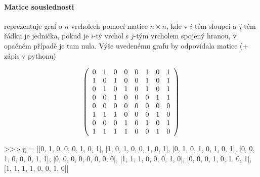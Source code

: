 \paragraph{Matice souslednosti} reprezentuje graf o $n$ vrcholech pomocí matice $n\times n$, kde v $i$-tém sloupci a $j$-tém řádku je jednička, pokud
je $i$-tý vrchol s $j$-tým vrcholem spojený hranou, v opačném případě je tam nula. Výše uvedenému grafu by odpovídala matice (+ zápis v pythonu)
\begin{center}
\begin{minipage}{5cm}
$$
\left(
\begin{array}{cccccccc}
0 & 1 & 0 & 0 & 0 & 1 & 0 & 1\cr
1 & 0 & 1 & 0 & 0 & 1 & 0 & 1\cr
0 & 1 & 0 & 1 & 0 & 1 & 0 & 1\cr
0 & 0 & 1 & 0 & 0 & 0 & 1 & 1\cr
0 & 0 & 0 & 0 & 0 & 0 & 0 & 0\cr
1 & 1 & 1 & 0 & 0 & 0 & 1 & 0\cr
0 & 0 & 0 & 1 & 0 & 1 & 0 & 1\cr
1 & 1 & 1 & 1 & 0 & 0 & 1 & 0\cr
\end{array}
\right)
$$
\end{minipage}
\hskip2cm
\begin{minipage}{8cm}
\begin{python}
>>> g = [[0, 1, 0, 0, 0, 1, 0, 1],
	 [1, 0, 1, 0, 0, 1, 0, 1],
	 [0, 1, 0, 1, 0, 1, 0, 1],
	 [0, 0, 1, 0, 0, 0, 1, 1],
	 [0, 0, 0, 0, 0, 0, 0, 0],
	 [1, 1, 1, 0, 0, 0, 1, 0],
	 [0, 0, 0, 1, 0, 1, 0, 1],
	 [1, 1, 1, 1, 0, 0, 1, 0]]
\end{python}
\end{minipage}
\end{center}

